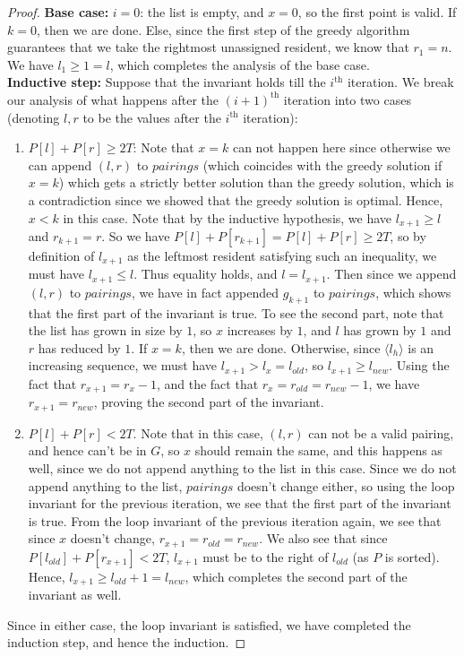\documentclass[answers]{exam}
\newcommand{\nl}{\vspace{0.2cm}\\}
\begin{document}
\begin{questions}
\begin{solution}
\begin{proof}
\textbf{Base case:} $i = 0$: the list is empty, and $x = 0$, so the first point is valid. If $k = 0$, then we are done. Else, since the first step of the greedy algorithm guarantees that we take the rightmost unassigned resident, we know that $r_1 = n$. We have $l_1 \ge 1 = l$, which completes the analysis of the base case.\nl
\textbf{Inductive step:} Suppose that the invariant holds till the $i^\mathrm{th}$ iteration.
We break our analysis of what happens after the $(i + 1)^\mathrm{th}$ iteration into two cases (denoting $l, r$ to be the values after the $i^\mathrm{th}$ iteration):
\begin{enumerate}
    \item $P[l] + P[r] \ge 2T$: 
    Note that $x = k$ can not happen here since otherwise we can append $(l, r)$ to $\mathit{pairings}$ (which coincides with the greedy solution if $x = k$) which gets a strictly better solution than the greedy solution, which is a contradiction since we showed that the greedy solution is optimal. Hence, $x < k$ in this case. Note that by the inductive hypothesis, we have $l_{x + 1} \ge l$ and $r_{k + 1} = r$. So we have $P[l] + P[r_{k + 1}] = P[l] + P[r] \ge 2T$, so by definition of $l_{x + 1}$ as the leftmost resident satisfying such an inequality, we must have $l_{x + 1} \le l$. Thus equality holds, and $l = l_{x + 1}$. Then since we append $(l, r)$ to $pairings$, we have in fact appended $g_{k + 1}$ to $pairings$, which shows that the first part of the invariant is true. To see the second part, note that the list has grown in size by $1$, so $x$ increases by $1$, and $l$ has grown by $1$ and $r$ has reduced by $1$. If $x = k$, then we are done. Otherwise, since $\langle l_h \rangle$ is an increasing sequence, we must have $l_{x + 1} > l_{x} = l_{old}$, so $l_{x + 1} \ge l_{new}$. Using the fact that $r_{x + 1} = r_x - 1$, and the fact that $r_x = r_{old} = r_{new} - 1$, we have $r_{x + 1} = r_{new}$, proving the second part of the invariant.
    \item $P[l] + P[r] < 2T$. Note that in this case, $(l, r)$ can not be a valid pairing, and hence can't be in $G$, so $x$ should remain the same, and this happens as well, since we do not append anything to the list in this case. Since we do not append anything to the list, $\mathit{pairings}$ doesn't change either, so using the loop invariant for the previous iteration, we see that the first part of the invariant is true. From the loop invariant of the previous iteration again, we see that since $x$ doesn't change, $r_{x + 1} = r_{old} = r_{new}$. We also see that since $P[l_{old}] + P[r_{x + 1}] < 2T$, $l_{x + 1}$ must be to the right of $l_{old}$ (as $P$ is sorted). Hence, $l_{x + 1} \ge l_{old} + 1 = l_{new}$, which completes the second part of the invariant as well.
\end{enumerate}
Since in either case, the loop invariant is satisfied, we have completed the induction step, and hence the induction.
\end{proof}


\end{solution}
\end{questions}
\end{document}
